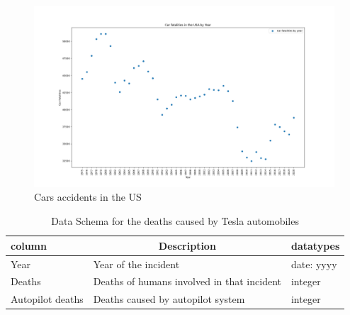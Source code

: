 \documentclass[
  man,floatsintext]{apa7}
\begin{document}
\begin{figure}

{\centering \includegraphics{./graphs/car_fatalities} 

}

\caption{Cars accidents in the US}\label{fig:car-incidents}
\end{figure}

\begin{table}[tbp]

\begin{center}
\begin{threeparttable}

\caption{\label{tab:tesla-deaths-schema}Data Schema for the deaths caused by Tesla automobiles}

\begin{tabular}{lll}
\toprule
column & \multicolumn{1}{c}{Description} & \multicolumn{1}{c}{datatypes}\\
\midrule
Year & Year of the incident & date: yyyy\\
Deaths & Deaths of humans involved in that incident & integer\\
Autopilot deaths & Deaths caused by autopilot system & integer\\
\bottomrule
\end{tabular}

\end{threeparttable}
\end{center}

\end{table}
\end{document}
